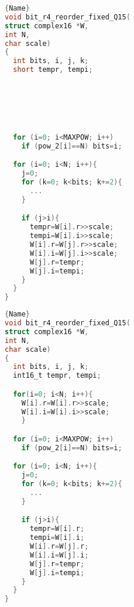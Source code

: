 \documentclass[a4paper]{article}
\begin{document}
\noindent\begin{minipage}{.45\textwidth}
	\begin{lstlisting}[caption=fft.c - bit reordering - original, label={CODE:REORDERO}, frame=tlrb, language=C]{Name}
void bit_r4_reorder_fixed_Q15(
struct complex16 *W,
int N,
char scale)
{
  int bits, i, j, k;
  short tempr, tempi;






  for (i=0; i<MAXPOW; i++)
    if (pow_2[i]==N) bits=i;

  for (i=0; i<N; i++){
    j=0;
    for (k=0; k<bits; k+=2){
      ...
    }

    if (j>i){
      tempr=W[i].r>>scale;
      tempi=W[i].i>>scale;
      W[i].r=W[j].r>>scale;
      W[i].i=W[j].i>>scale;
      W[j].r=tempr;
      W[j].i=tempi;
    }
  }
}
\end{lstlisting}
\end{minipage}\hfill
\begin{minipage}{.45\textwidth}
\begin{lstlisting}[caption=fft.c - bit reordering - modified, label={CODE:REORDERM}, frame=tlrb, language=C]{Name}
void bit_r4_reorder_fixed_Q15(
struct complex16 *W,
int N,
char scale)
{
  int bits, i, j, k;
  int16_t tempr, tempi;

  for(i=0; i<N; i++){
    W[i].r=W[i].r>>scale;
	W[i].i=W[i].i>>scale;
	}

  for (i=0; i<MAXPOW; i++)
    if (pow_2[i]==N) bits=i;

  for (i=0; i<N; i++){
    j=0;
   	for (k=0; k<bits; k+=2){
   	  ...
   	}

    if (j>i){
      tempr=W[i].r;
      tempi=W[i].i;
      W[i].r=W[j].r;
      W[i].i=W[j].i;
      W[j].r=tempr;
      W[j].i=tempi;
    }
  }
}
    \end{lstlisting}
\end{minipage}    
\newpage
\end{document}
